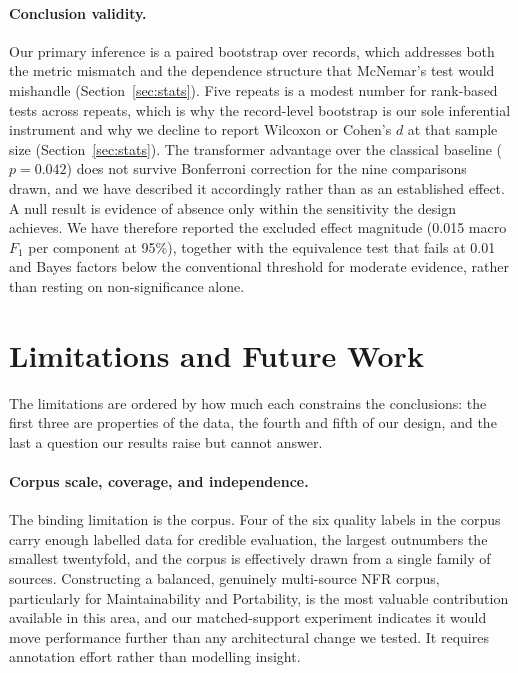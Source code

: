 \documentclass[11pt,a4paper]{article}
\begin{document}
\paragraph{Conclusion validity.}
Our primary inference is a paired bootstrap over records, which addresses both the metric
mismatch and the dependence structure that McNemar's test would mishandle
(Section~\ref{sec:stats}). Five repeats is a modest number for rank-based tests across repeats, which is why the
record-level bootstrap is our sole inferential instrument and why we decline to report
Wilcoxon or Cohen's $d$ at that sample size (Section~\ref{sec:stats}). The transformer advantage over the classical baseline
($p = 0.042$) does not survive Bonferroni correction for the nine comparisons drawn, and we
have described it accordingly rather than as an established effect. A null result is
evidence of absence only within the sensitivity the design achieves. We have therefore reported the excluded effect magnitude (0.015 macro $F_1$ per component at 95\%), together with the
equivalence test that fails at 0.01 and Bayes factors below the conventional threshold for
moderate evidence, rather than resting on
non-significance alone.

\section{Limitations and Future Work}
\label{sec:future}

The limitations are ordered by how much each constrains the conclusions: the first three are
properties of the data, the fourth and fifth of our design, and the last a question our results
raise but cannot answer.

\paragraph{Corpus scale, coverage, and independence.}
The binding limitation is the corpus. Four of the six quality labels in the corpus carry enough
labelled data for credible evaluation, the largest outnumbers the smallest twentyfold, and
the corpus is effectively drawn from a single family of sources. Constructing a balanced,
genuinely multi-source NFR corpus, particularly for Maintainability and Portability, is the most valuable contribution available in this area, and our matched-support
experiment indicates it would move performance further than any architectural change we
tested. It requires annotation effort rather than modelling insight.
\end{document}
